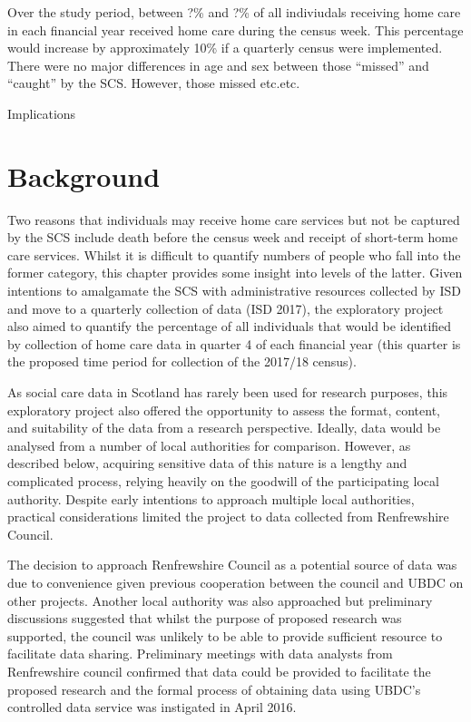 \documentclass[]{article}
\begin{document}
Over the study period, between ?\% and ?\% of all indiviudals receiving
home care in each financial year received home care during the census
week. This percentage would increase by approximately 10\% if a
quarterly census were implemented. There were no major differences in
age and sex between those ``missed'' and ``caught'' by the SCS. However,
those missed etc.etc.

Implications

\section{Background}\label{sec:renf-background}

Two reasons that individuals may receive home care services but not be
captured by the SCS include death before the census week and receipt of
short-term home care services. Whilst it is difficult to quantify
numbers of people who fall into the former category, this chapter
provides some insight into levels of the latter. Given intentions to
amalgamate the SCS with administrative resources collected by ISD and
move to a quarterly collection of data (ISD 2017), the exploratory
project also aimed to quantify the percentage of all individuals that
would be identified by collection of home care data in quarter 4 of each
financial year (this quarter is the proposed time period for collection
of the 2017/18 census).

As social care data in Scotland has rarely been used for research
purposes, this exploratory project also offered the opportunity to
assess the format, content, and suitability of the data from a research
perspective. Ideally, data would be analysed from a number of local
authorities for comparison. However, as described below, acquiring
sensitive data of this nature is a lengthy and complicated process,
relying heavily on the goodwill of the participating local authority.
Despite early intentions to approach multiple local authorities,
practical considerations limited the project to data collected from
Renfrewshire Council.

The decision to approach Renfrewshire Council as a potential source of
data was due to convenience given previous cooperation between the
council and UBDC on other projects. Another local authority was also
approached but preliminary discussions suggested that whilst the purpose
of proposed research was supported, the council was unlikely to be able
to provide sufficient resource to facilitate data sharing. Preliminary
meetings with data analysts from Renfrewshire council confirmed that
data could be provided to facilitate the proposed research and the
formal process of obtaining data using UBDC's controlled data service
was instigated in April 2016.
\end{document}
